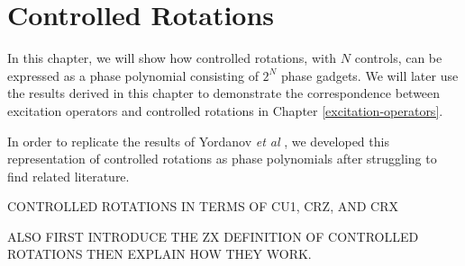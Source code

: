 \chapter{Controlled Rotations}%
\label{controlled-rotations}

In this chapter, we will show how controlled rotations, with $N$ controls, can be expressed as a phase polynomial consisting of $2^N$ phase gadgets. We will later use the results derived in this chapter to demonstrate the correspondence between excitation operators and controlled rotations in Chapter \ref{excitation-operators}.

In order to replicate the results of Yordanov \textit{et al} \cite{Yordanov2020}, we developed this representation of controlled rotations as phase polynomials after struggling to find related literature.



CONTROLLED ROTATIONS IN TERMS OF CU1, CRZ, AND CRX

ALSO FIRST INTRODUCE THE ZX DEFINITION OF CONTROLLED ROTATIONS THEN EXPLAIN HOW THEY WORK.
